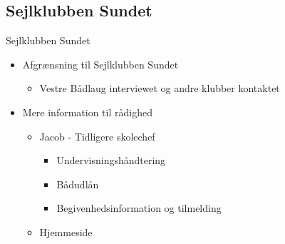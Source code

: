 \subsection{Sejlklubben Sundet}
\begin{frame}{Sejlklubben Sundet}
	\begin{itemize}
	\item Afgrænsning til Sejlklubben Sundet
			\begin{itemize}
			\item Vestre Bådlaug interviewet og andre klubber kontaktet
			\end{itemize}
	\item Mere information til rådighed
			\begin{itemize}
			\item Jacob - Tidligere skolechef
				\begin{itemize}
				\item Undervisningshåndtering
				\item Bådudlån
				\item Begivenhedsinformation og tilmelding
				\end{itemize}
			\item Hjemmeside
			\end{itemize}	
	\end{itemize}
	
\end{frame}